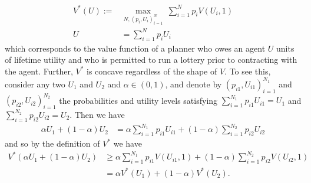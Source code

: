 \documentclass[11pt]{article}
\theoremstyle{plain}
\begin{document}
\begin{align*}
V^*(U) := & \max_{N,(p_i,U_i)_{i=1}^N} \ \sum_{i=1}^N p_i V(U_i,1)
\\ U & = \sum_{i=1}^N p_i U_i 
\end{align*}
which corresponds to the value function of a planner who owes an agent $U$ units of lifetime utility and who is permitted to run a lottery prior to contracting with the agent. Further, $V^*$ is concave regardless of the shape of $V$. To see this, consider any two $U_1$ and $U_2$ and $\alpha \in (0,1)$, and denote by $(p_{i1},U_{i1})_{i=1}^{N_1}$ and $(p_{i2},U_{i2})_{i=1}^{N_2}$ the probabilities and utility levels satisfying $\sum_{i=1}^{N_1} p_{i1} U_{i1} = U_1$ and $\sum_{i=1}^{N_2} p_{i2} U_{i2} = U_2$. Then we have 
\begin{align*}
\alpha U_1 + (1-\alpha)U_2 & = \alpha \sum_{i=1}^{N_1} p_{i1} U_{i1} + (1-\alpha)\sum_{i=1}^{N_2} p_{i2} U_{i2}
\end{align*}
and so by the definition of $V^*$ we have 
\begin{align*}
V^*(\alpha U_1 + (1-\alpha)U_2) & \geq \alpha\sum_{i=1}^{N_1} p_{i1} V(U_{i1},1) + (1-\alpha)\sum_{i=1}^{N_2} p_{i2} V(U_{i2},1)
\\ & = \alpha V^*(U_1) + (1 - \alpha) V^*(U_2).
\end{align*}
\fi
\end{document}
